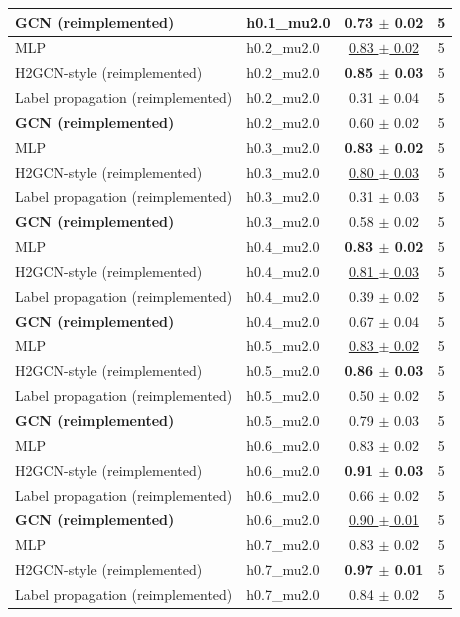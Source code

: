 \begin{tabular}{llcc}
\textbf{GCN (reimplemented)} & h0.1\_mu2.0 & 0.73 $\pm$ 0.02 & 5 \\
\midrule
MLP & h0.2\_mu2.0 & \underline{0.83 $\pm$ 0.02} & 5 \\
H2GCN-style (reimplemented) & h0.2\_mu2.0 & \textbf{0.85 $\pm$ 0.03} & 5 \\
Label propagation (reimplemented) & h0.2\_mu2.0 & 0.31 $\pm$ 0.04 & 5 \\
\textbf{GCN (reimplemented)} & h0.2\_mu2.0 & 0.60 $\pm$ 0.02 & 5 \\
\midrule
MLP & h0.3\_mu2.0 & \textbf{0.83 $\pm$ 0.02} & 5 \\
H2GCN-style (reimplemented) & h0.3\_mu2.0 & \underline{0.80 $\pm$ 0.03} & 5 \\
Label propagation (reimplemented) & h0.3\_mu2.0 & 0.31 $\pm$ 0.03 & 5 \\
\textbf{GCN (reimplemented)} & h0.3\_mu2.0 & 0.58 $\pm$ 0.02 & 5 \\
\midrule
MLP & h0.4\_mu2.0 & \textbf{0.83 $\pm$ 0.02} & 5 \\
H2GCN-style (reimplemented) & h0.4\_mu2.0 & \underline{0.81 $\pm$ 0.03} & 5 \\
Label propagation (reimplemented) & h0.4\_mu2.0 & 0.39 $\pm$ 0.02 & 5 \\
\textbf{GCN (reimplemented)} & h0.4\_mu2.0 & 0.67 $\pm$ 0.04 & 5 \\
\midrule
MLP & h0.5\_mu2.0 & \underline{0.83 $\pm$ 0.02} & 5 \\
H2GCN-style (reimplemented) & h0.5\_mu2.0 & \textbf{0.86 $\pm$ 0.03} & 5 \\
Label propagation (reimplemented) & h0.5\_mu2.0 & 0.50 $\pm$ 0.02 & 5 \\
\textbf{GCN (reimplemented)} & h0.5\_mu2.0 & 0.79 $\pm$ 0.03 & 5 \\
\midrule
MLP & h0.6\_mu2.0 & 0.83 $\pm$ 0.02 & 5 \\
H2GCN-style (reimplemented) & h0.6\_mu2.0 & \textbf{0.91 $\pm$ 0.03} & 5 \\
Label propagation (reimplemented) & h0.6\_mu2.0 & 0.66 $\pm$ 0.02 & 5 \\
\textbf{GCN (reimplemented)} & h0.6\_mu2.0 & \underline{0.90 $\pm$ 0.01} & 5 \\
\midrule
MLP & h0.7\_mu2.0 & 0.83 $\pm$ 0.02 & 5 \\
H2GCN-style (reimplemented) & h0.7\_mu2.0 & \textbf{0.97 $\pm$ 0.01} & 5 \\
Label propagation (reimplemented) & h0.7\_mu2.0 & 0.84 $\pm$ 0.02 & 5 \\

\end{tabular}
